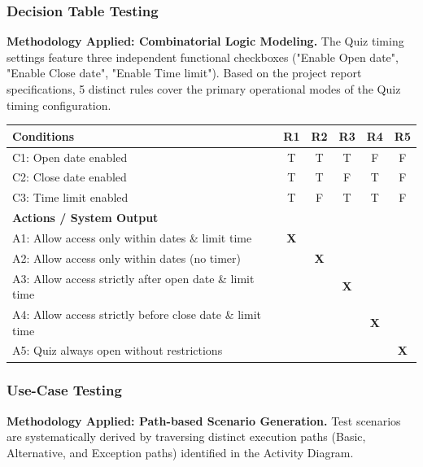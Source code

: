 \documentclass[twoside,final]{hcmut-report}
\begin{document}
\subsubsection{Decision Table Testing}
\textbf{Methodology Applied: Combinatorial Logic Modeling.} 
The Quiz timing settings feature three independent functional checkboxes ("Enable Open date", "Enable Close date", "Enable Time limit"). Based on the project report specifications, 5 distinct rules cover the primary operational modes of the Quiz timing configuration.

\begin{table}[H]
\centering
\renewcommand{\arraystretch}{1.2}
\begin{tabularx}{\textwidth}{|>{\raggedright\arraybackslash}X|c|c|c|c|c|}
\hline
\textbf{Conditions} & \textbf{R1} & \textbf{R2} & \textbf{R3} & \textbf{R4} & \textbf{R5} \\ \hline
C1: Open date enabled & T & T & T & F & F \\ \hline
C2: Close date enabled & T & T & F & T & F \\ \hline
C3: Time limit enabled & T & F & T & T & F \\ \hline
\hline
\textbf{Actions / System Output} & & & & & \\ \hline
A1: Allow access only within dates \& limit time & \textbf{X} & & & & \\ \hline
A2: Allow access only within dates (no timer) & & \textbf{X} & & & \\ \hline
A3: Allow access strictly after open date \& limit time & & & \textbf{X} & & \\ \hline
A4: Allow access strictly before close date \& limit time & & & & \textbf{X} & \\ \hline
A5: Quiz always open without restrictions & & & & & \textbf{X} \\ \hline
\end{tabularx}
\end{table}

\subsubsection{Use-Case Testing}
\textbf{Methodology Applied: Path-based Scenario Generation.} 
Test scenarios are systematically derived by traversing distinct execution paths (Basic, Alternative, and Exception paths) identified in the Activity Diagram.
\end{document}
